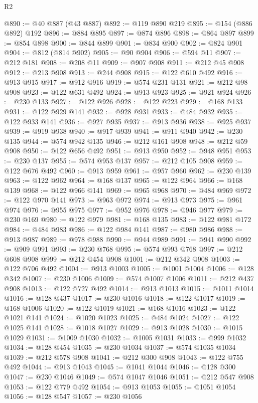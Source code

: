 \begin{lexlean}{R2}
\begin{coremodule}
{{{{{{{{{{{{{{{{{{{{{{{{{{{{{{{{{{{{{{{{{{{{{{{{{{{{{{{{{{{{{{{{{{{{{{{{{{{{{{{{{{{{{{{{{{{{@890 := @40 @887 (@43 @887)
@892 := @119 @890 @219
@895 := @154 (@886 @892) @192
@896 := @884 @895
@897 := @874 @896
@898 := @864 @897
@899 := @854 @898
@900 := @844 @899
@901 := @834 @900
@902 := @824 @901
@904 := @812 (@814 @902)
@905 := @90 @904
@906 := @594 @11
@907 := @212 @181
@908 := @208 @11
@909 := @907 @908
@911 := @212 @45 @908
@912 := @213 @908
@913 := @244 @908
@915 := @122 @610 @492
@916 := @913 @915
@917 := @912 @916
@919 := @574 @231 @131
@921 := @212 @98 @908
@923 := @122 @631 @492
@924 := @913 @923
@925 := @921 @924
@926 := @230 @133
@927 := @122 @926
@928 := @122 @223
@929 := @168 @133
@931 := @122 @929 @141
@932 := @928 @931
@933 := @484 @932
@935 := @122 @933 @141
@936 := @927 @935
@937 := @913 @936
@938 := @925 @937
@939 := @919 @938
@940 := @917 @939
@941 := @911 @940
@942 := @230 @135
@944 := @574 @942 @135
@946 := @212 @161 @908
@948 := @212 @59 @908
@950 := @122 @656 @492
@951 := @913 @950
@952 := @948 @951
@953 := @230 @137
@955 := @574 @953 @137
@957 := @212 @105 @908
@959 := @122 @676 @492
@960 := @913 @959
@961 := @957 @960
@962 := @230 @139
@963 := @122 @962
@964 := @168 @137
@965 := @122 @964
@966 := @168 @139
@968 := @122 @966 @141
@969 := @965 @968
@970 := @484 @969
@972 := @122 @970 @141
@973 := @963 @972
@974 := @913 @973
@975 := @961 @974
@976 := @955 @975
@977 := @952 @976
@978 := @946 @977
@979 := @230 @169
@980 := @122 @979
@981 := @168 @135
@983 := @122 @981 @172
@984 := @484 @983
@986 := @122 @984 @141
@987 := @980 @986
@988 := @913 @987
@989 := @978 @988
@990 := @944 @989
@991 := @941 @990
@992 := @909 @991
@993 := @230 @768
@995 := @574 @993 @768
@997 := @212 @608 @908
@999 := @212 @454 @908
@1001 := @212 @342 @908
@1003 := @122 @706 @492
@1004 := @913 @1003
@1005 := @1001 @1004
@1006 := @128 @342
@1007 := @230 @1006
@1009 := @574 @1007 @1006
@1011 := @212 @437 @908
@1013 := @122 @727 @492
@1014 := @913 @1013
@1015 := @1011 @1014
@1016 := @128 @437
@1017 := @230 @1016
@1018 := @122 @1017
@1019 := @168 @1006
@1020 := @122 @1019
@1021 := @168 @1016
@1023 := @122 @1021 @141
@1024 := @1020 @1023
@1025 := @484 @1024
@1027 := @122 @1025 @141
@1028 := @1018 @1027
@1029 := @913 @1028
@1030 := @1015 @1029
@1031 := @1009 @1030
@1032 := @1005 @1031
@1033 := @999 @1032
@1034 := @128 @454
@1035 := @230 @1034
@1037 := @574 @1035 @1034
@1039 := @212 @578 @908
@1041 := @212 @300 @908
@1043 := @122 @755 @492
@1044 := @913 @1043
@1045 := @1041 @1044
@1046 := @128 @300
@1047 := @230 @1046
@1049 := @574 @1047 @1046
@1051 := @212 @547 @908
@1053 := @122 @779 @492
@1054 := @913 @1053
@1055 := @1051 @1054
@1056 := @128 @547
@1057 := @230 @1056
}}}}}}}}}}}}}}}}}}}}}}}}}}}}}}}}}}}}}}}}}}}}}}}}}}}}}}}}}}}}}}}}}}}}}}}}}}}}}}}}}}}}}}}}}}}}
\end{coremodule}
\end{lexlean}
